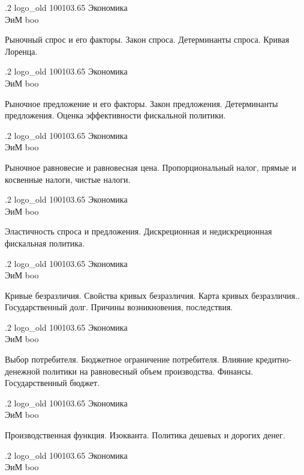 \documentclass[
	12pt,
	a4paper,
	]
	{article}
\newcommand{\shapkFull}{
	\shapk
		{.2}
		{logo_old}
		{100103.65}
		{Экономика\\}
		{ЭиМ}
		{boo}
}
\begin{document}
\newpage


\shapkFull
\setcounter{zad}{0}

\z 	Рыночный спрос и его факторы.  Закон спроса. Детерминанты спроса.
 \medskip
\z 	Кривая Лоренца.
 \medskip

\newpage


\shapkFull
\setcounter{zad}{0}

\z 	Рыночное предложение и его факторы.  Закон предложения. Детерминанты предложения.
 \medskip
\z 	Оценка эффективности фискальной политики.
 \medskip

\newpage


\shapkFull
\setcounter{zad}{0}

\z 	Рыночное равновесие и равновесная цена.
 \medskip
\z 	Пропорциональный налог, прямые и косвенные налоги, чистые налоги.
 \medskip

\newpage


\shapkFull
\setcounter{zad}{0}

\z 	Эластичность спроса и предложения.
 \medskip
\z 	Дискреционная и недискреционная фискальная политика.
 \medskip

\newpage


\shapkFull
\setcounter{zad}{0}

\z 	Кривые безразличия. Свойства кривых безразличия. Карта кривых безразличия..
 \medskip
\z 	Государственный долг. Причины возникновения, последствия.
 \medskip

\newpage


\shapkFull
\setcounter{zad}{0}

\z 	Выбор потребителя. Бюджетное ограничение потребителя.
 \medskip
\z 	Влияние кредитно-денежной политики на равновесный объем производства.	Финансы. Государственный бюджет.
 \medskip

\newpage


\shapkFull
\setcounter{zad}{0}

\z 	Производственная функция. Изокванта.
 \medskip
\z 	Политика дешевых и дорогих денег.
 \medskip

\newpage


\shapkFull
\setcounter{zad}{0}
\end{document}
